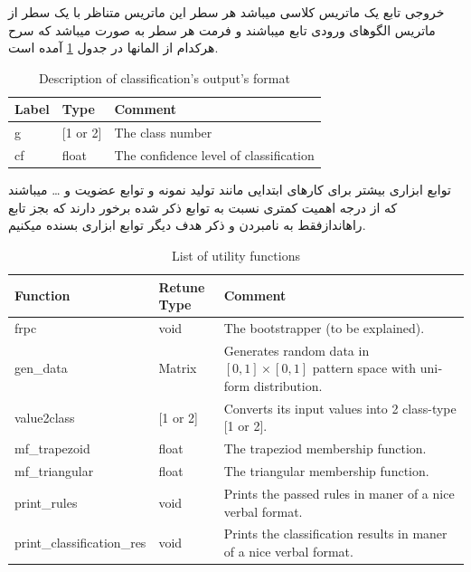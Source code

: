 \documentclass[10pt,a4paper]{article}
\newcommand{\نیمفاصله}{\halfspace}
\renewcommand{\ }{\halfspace}
\renewcommand{\m}[1]{\lr{\mcode{#1}}}
\begin{document}
خروجی تابع
\m{function z = classifier(.)}
یک ماتریس کلاسی می\ باشد هر سطر این ماتریس متناظر با یک سطر از ماتریس الگوهای ورودی تابع می\ باشند و فرمت هر سطر به صورت
\m{[g cf]}
می\ باشد که سرح هرکدام از المان\ ها در جدول
\ref{tab:classifier_return}
آمده است.
\begin{latin}
    \begin{table}[h]
        \centering
        \begin{tabular}{ | l | l | l | }
            \hline        
            Label    & Type       & Comment\\\hline
            g        & [1 or 2]   & The class number\\\hline
            cf       & float      & The confidence level of classification\\\hline
        \end{tabular}
        \caption{Description of classification's output's format}
        \label{tab:classifier_return}
    \end{table}
\end{latin}
توابع ابزاری بیشتر برای کارهای ابتدایی مانند تولید نمونه و توابع عضویت و \ldots\hspace{1pt} می\ باشند که از درجه اهمیت کمتری نسبت به توابع ذکر شده برخور دارند که بجز تابع راه\ انداز\
[\m{frpc(.)}]
فقط به نام\ بردن و ذکر هدف دیگر توابع ابزاری بسنده می\ کنیم.
\begin{latin}
    \begin{table}[h]
        \centering
        \begin{tabular}{ | l | l | p{8cm} | }
            \hline        
            Function                   & Retune Type  & Comment\\\hline
            frpc                       & void         & The bootstrapper (to be explained).\\\hline
            gen\_data                  & Matrix       & Generates random data in $[0, 1]\times[0, 1]$ pattern space with uniform distribution.\\\hline
            value2class                & [1 or 2]     & Converts its input values into 2 class-type [1 or 2].\\\hline
            mf\_trapezoid              & float        & The trapeziod membership function.\\\hline
            mf\_triangular             & float        & The triangular membership function.\\\hline
            print\_rules               & void         & Prints the passed rules in maner of a nice verbal format.\\\hline
            print\_classification\_res & void         & Prints the classification results in maner of a nice verbal format.\\\hline
        \end{tabular}
        \caption{List of utility functions}
        \label{tab:utility_functions}
    \end{table}
\end{latin}
\end{document}
